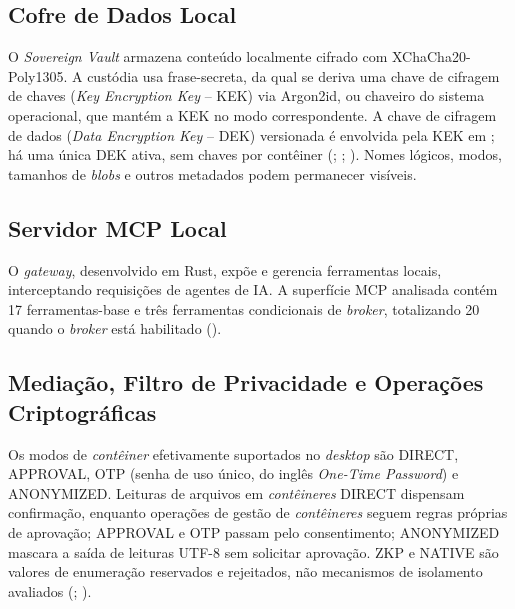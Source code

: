 \documentclass[12pt,openright,twoside,a4paper,english,brazil]{abntex2}
\begin{document}
\subsection{Cofre de Dados Local}
O \textit{Sovereign Vault} armazena conteúdo localmente cifrado com XChaCha20-Poly1305. A custódia usa frase-secreta, da qual se deriva uma chave de cifragem de chaves (\textit{Key Encryption Key} -- KEK) via Argon2id, ou chaveiro do sistema operacional, que mantém a KEK no modo correspondente. A chave de cifragem de dados (\textit{Data Encryption Key} -- DEK) versionada é envolvida pela KEK em ; há uma única DEK ativa, sem chaves por contêiner (; ; ). Nomes lógicos, modos, tamanhos de \textit{blobs} e outros metadados podem permanecer visíveis.

\subsection{Servidor MCP Local}
O \textit{gateway}, desenvolvido em Rust, expõe e gerencia ferramentas locais, interceptando requisições de agentes de IA. A superfície MCP analisada contém 17 ferramentas-base e três ferramentas condicionais de \textit{broker}, totalizando 20 quando o \textit{broker} está habilitado ().

\subsection{Mediação, Filtro de Privacidade e Operações Criptográficas}
Os modos de \textit{contêiner} efetivamente suportados no \textit{desktop} são DIRECT, APPROVAL, OTP (senha de uso único, do inglês \textit{One-Time Password}) e ANONYMIZED. Leituras de arquivos em \textit{contêineres} DIRECT dispensam confirmação, enquanto operações de gestão de \textit{contêineres} seguem regras próprias de aprovação; APPROVAL e OTP passam pelo consentimento; ANONYMIZED mascara a saída de leituras UTF-8 sem solicitar aprovação. ZKP e NATIVE são valores de enumeração reservados e rejeitados, não mecanismos de isolamento avaliados (; ).
\end{document}
